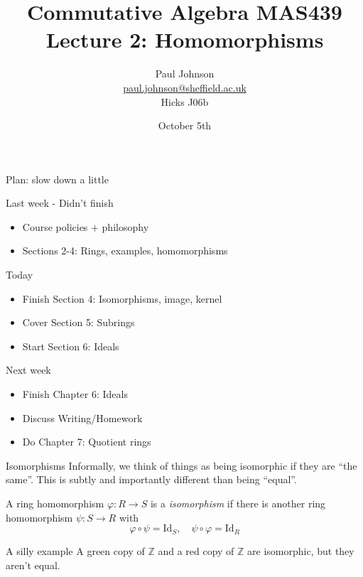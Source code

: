 \documentclass{beamer}
\title{Commutative Algebra MAS439 \\ Lecture 2: Homomorphisms}
\author{Paul Johnson \\ \href{mailto:paul.johnson@sheffield.ac.uk}{paul.johnson@sheffield.ac.uk} \\ Hicks J06b}
\date{October 5th}
\newcommand{\Z}{\mathbb{Z}}
\begin{document}
\begin{frame}
\titlepage
\end{frame}

\begin{frame}{Plan: slow down a little}

  \begin{block}{Last week - Didn't finish}
    \begin{itemize}
\item Course policies + philosophy
    \item  Sections 2-4: Rings, examples, homomorphisms
\end{itemize}
  \end{block}
  \begin{block}{Today}
\begin{itemize}
\item    Finish Section 4: Isomorphisms, image, kernel
\item    Cover Section 5: Subrings
\item   Start Section 6: Ideals  
\end{itemize}
\end{block}

\begin{block}{Next week}
  \begin{itemize}
  \item Finish Chapter 6: Ideals
  \item Discuss Writing/Homework
  \item Do Chapter 7: Quotient rings
  \end{itemize}
\end{block}
\end{frame}

\begin{frame}{Isomorphisms}
Informally, we think of things as being isomorphic if they are ``the same''.  This is subtly and importantly different than being ``equal''.  

\begin{definition}
A ring homomorphism $\varphi:R\to S$ is a \emph{isomorphism} if there is another ring homomorphism $\psi:S\to R$ with $$\varphi\circ\psi=\text{Id}_S, \quad\psi\circ\varphi=\text{Id}_R$$
  \end{definition} 

\begin{block}{A silly example}
A green copy of $\Z$ and a red copy of $\Z$ are isomorphic, but they aren't equal.
\end{block}

\end{frame}
\end{document}
